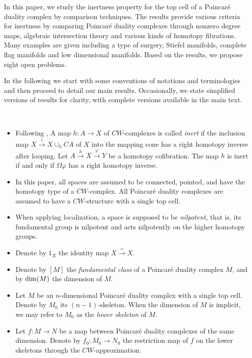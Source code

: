 \documentclass[a4]{amsart}
\theoremstyle{definition}
\begin{document}
\begin{sloppypar}
In this paper, we study the inertness property for the top cell of a Poincar\'{e} duality complex by comparison techniques. The results provide various criteria for inertness by comparing Poincar\'{e} duality complexes through nonzero degree maps, algebraic intersection theory and various kinds of homotopy fibrations. Many examples are given including a type of surgery, Stiefel manifolds, complete flag manifolds and low dimensional manifolds. Based on the results, we propose eight open problems. 

In the following we start with some conventions of notations and terminologies and then proceed to detail our main results. Occasionally, we state simplified versions of results for clarity, with complete versions available in the main text.

$\, $


\begin{itemize}
\item Following \cite{The24a}, A map $h: A\stackrel{}{\longrightarrow} X$ of $CW$-complexes is called {\it inert} if the inclusion map $X\stackrel{i}{\longrightarrow} X\cup_h CA$ of $X$ into the mapping cone has a right homotopy inverse after looping. 
Let $A\stackrel{h}{\longrightarrow} X\stackrel{\varphi}{\longrightarrow} Y$ be a homotopy cofibration. The map $h$ is inert if and only if $\Omega \varphi$ has a right homotopy inverse. 
\item In this paper, all spaces are assumed to be connected, pointed, and have the homotopy type of a $CW$-complex. All Poincar\'{e} duality complexes are assumed to have a $CW$-structure with a single top cell. 
\item When applying localization, a space is supposed to be {\it nilpotent}, that is, its fundamental group is nilpotent and acts nilpotently on the higher homotopy groups. 
\item Denote by $1_X$ the identity map $X\stackrel{=}{\longrightarrow} X$.
\item Denote by $[M]$ the {\it fundamental class} of a Poincar\'{e} duality complex $M$, and by ${\rm dim}(M)$ the dimension of $M$. 
\item Let $M$ be an $n$-dimensional Poincar\'{e} duality complex with a single top cell. Denote by $M_0$ its $(n-1)$-skeleton. When the dimension of $M$ is implicit, we may refer to $M_0$ as the {\it lower skeleton} of $M$.  
\item Let $f: M\stackrel{}{\longrightarrow} N$ be a map between Poincar\'{e} duality complexes of the same dimension. Denote by $f_0: M_0\stackrel{}{\longrightarrow} N_0$ the restriction map of $f$ on the lower skeletons through the $CW$-approximation. 
\end{itemize} 



\end{sloppypar}
\end{document}
